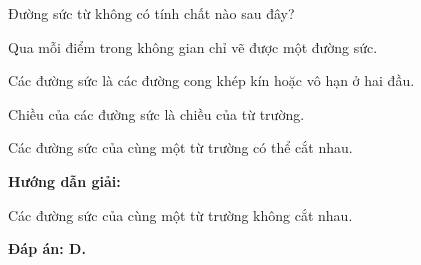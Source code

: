 	{
	Đường sức từ không có tính chất nào sau đây?
	\begin{mcq}
		\item Qua mỗi điểm trong không gian chỉ vẽ được một đường sức.
		\item Các đường sức là các đường cong khép kín hoặc vô hạn ở hai đầu.
		\item Chiều của các đường sức là chiều của từ trường. 
		\item Các đường sức của cùng một từ trường có thể cắt nhau.
	\end{mcq}
}{
\begin{center}
		\textbf{Hướng dẫn giải:}
\end{center}

	Các đường sức của cùng một từ trường không cắt nhau.
	
\textbf{	Đáp án: D.}
	
}




